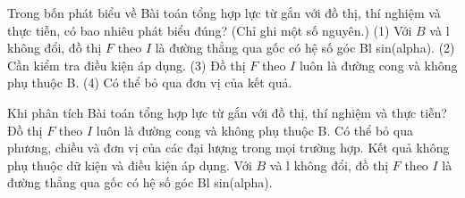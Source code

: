 \begin{ex}
Trong bốn phát biểu về Bài toán tổng hợp lực từ gắn với đồ thị, thí nghiệm và thực tiễn, có bao nhiêu phát biểu đúng? (Chỉ ghi một số nguyên.) (1) Với $B$ và l không đổi, đồ thị $F$ theo $I$ là đường thẳng qua gốc có hệ số góc Bl sin(alpha). (2) Cần kiểm tra điều kiện áp dụng. (3) Đồ thị $F$ theo $I$ luôn là đường cong và không phụ thuộc B. (4) Có thể bỏ qua đơn vị của kết quả.
\end{ex}

\begin{ex}
Khi phân tích Bài toán tổng hợp lực từ gắn với đồ thị, thí nghiệm và thực tiễn?
\choice
{Đồ thị $F$ theo $I$ luôn là đường cong và không phụ thuộc B.}
{Có thể bỏ qua phương, chiều và đơn vị của các đại lượng trong mọi trường hợp.}
{Kết quả không phụ thuộc dữ kiện và điều kiện áp dụng.}
{\True Với $B$ và l không đổi, đồ thị $F$ theo $I$ là đường thẳng qua gốc có hệ số góc Bl sin(alpha).}
\end{ex}

